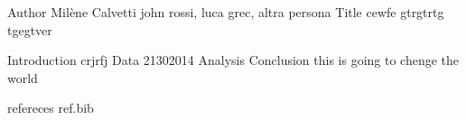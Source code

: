 
Author Milène Calvetti john rossi, luca grec, altra persona
Title cewfe gtrgtrtg tgegtver

Introduction crjrfj  
Data 21302014
Analysis
Conclusion this is going to chenge the world

refereces 
ref.bib

